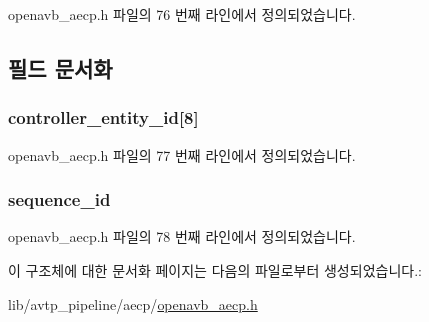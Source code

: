 openavb\+\_\+aecp.\+h 파일의 76 번째 라인에서 정의되었습니다.



\subsection{필드 문서화}
\subsubsection[{\texorpdfstring{controller\+\_\+entity\+\_\+id}{controller_entity_id}}]{ controller\+\_\+entity\+\_\+id\mbox{[}8\mbox{]}}\hypertarget{structopenavb__aecp__common__data__unit__t_a8b74ba582b9c19e1f2e475925f7cfb2f}{}\label{structopenavb__aecp__common__data__unit__t_a8b74ba582b9c19e1f2e475925f7cfb2f}


openavb\+\_\+aecp.\+h 파일의 77 번째 라인에서 정의되었습니다.

\subsubsection[{\texorpdfstring{sequence\+\_\+id}{sequence_id}}]{ sequence\+\_\+id}\hypertarget{structopenavb__aecp__common__data__unit__t_ada45e1a0fe13471280842df714983d95}{}\label{structopenavb__aecp__common__data__unit__t_ada45e1a0fe13471280842df714983d95}


openavb\+\_\+aecp.\+h 파일의 78 번째 라인에서 정의되었습니다.



이 구조체에 대한 문서화 페이지는 다음의 파일로부터 생성되었습니다.\+:\begin{DoxyCompactItemize}
\item 
lib/avtp\+\_\+pipeline/aecp/\hyperlink{openavb__aecp_8h}{openavb\+\_\+aecp.\+h}\end{DoxyCompactItemize}
